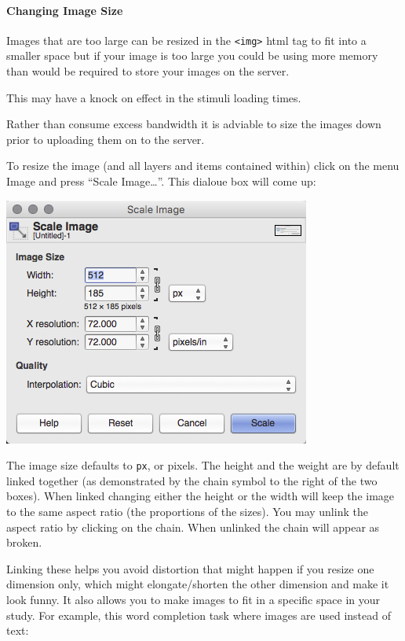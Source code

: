 \documentclass[]{book}
\let\oldparagraph\paragraph
\renewcommand{\paragraph}[1]{\oldparagraph{#1}\mbox{}}
\begin{document}
\paragraph{Changing Image Size}\label{changing-image-size}

Images that are too large can be resized in the
\texttt{\textless{}img\textgreater{}} html tag to fit into a smaller
space but if your image is too large you could be using more memory than
would be required to store your images on the server.

This may have a knock on effect in the stimuli loading times.

Rather than consume excess bandwidth it is adviable to size the images
down prior to uploading them on to the server.

To resize the image (and all layers and items contained within) click on
the menu Image and press ``Scale Image\ldots{}''. This dialoue box will
come up:

\includegraphics{images/screenshots/scale_image.png}

The image size defaults to \texttt{px}, or pixels. The height and the
weight are by default linked together (as demonstrated by the chain
symbol to the right of the two boxes). When linked changing either the
height or the width will keep the image to the same aspect ratio (the
proportions of the sizes). You may unlink the aspect ratio by clicking
on the chain. When unlinked the chain will appear as broken.

Linking these helps you avoid distortion that might happen if you resize
one dimension only, which might elongate/shorten the other dimension and
make it look funny. It also allows you to make images to fit in a
specific space in your study. For example, this word completion task
where images are used instead of text:
\end{document}
